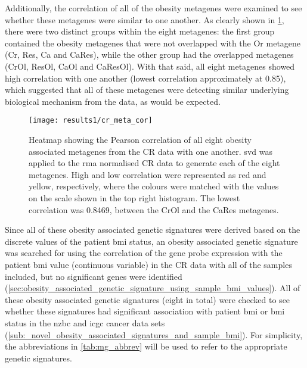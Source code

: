 Additionally, the correlation of all of the obesity metagenes were examined to see whether these metagenes were similar to one another.
As clearly shown in \cref{fig:cr_meta_cor}, there were two distinct groups within the eight metagenes: the first group contained the obesity metagenes that were not overlapped with the Or metagene (Cr, Res, Ca and CaRes), while the other group had the overlapped metagenes (CrOl, ResOl, CaOl and CaResOl).
With that said, all eight metagenes showed high correlation with one another (lowest correlation approximately at 0.85), which suggested that all of these metagenes were detecting similar underlying biological mechanism from the data, as would be expected.

\begin{figure}[tpb]
	\centering
	\texttt{[image: results1/cr\_meta\_cor]}
	\caption[Pearson correlation of all eight obesity metagenes identified in the CR data]{Heatmap showing the Pearson correlation of all eight obesity associated metagenes from the CR data with one another.
	\gls{svd} was applied to the \gls{rma} normalised CR data to generate each of the eight metagenes.
	High and low correlation were represented as red and yellow, respectively, where the colours were matched with the values on the scale shown in the top right histogram.
	The lowest correlation was 0.8469, between the CrOl and the CaRes metagenes.
	}
	\label{fig:cr_meta_cor}
\end{figure}

Since all of these obesity associated genetic signatures were derived based on the discrete values of the patient \gls{bmi} status, an obesity associated genetic signature was searched for using the correlation of the gene probe expression with the patient \gls{bmi} value (continuous variable) in the CR data with all of the samples included, but no significant genes were identified (\cref{sec:obesity_associated_genetic_signature_using_sample_bmi_values}).
All of these obesity associated genetic signatures (eight in total) were checked to see whether these signatures had significant association with patient \gls{bmi} or \gls{bmi} status in the \gls{nzbc} and \gls{icgc} cancer data sets (\cref{sub:_novel_obesity_associated_signatures_and_sample_bmi}).
For simplicity, the abbreviations in \cref{tab:mg_abbrev} will be used to refer to the appropriate genetic signatures.

